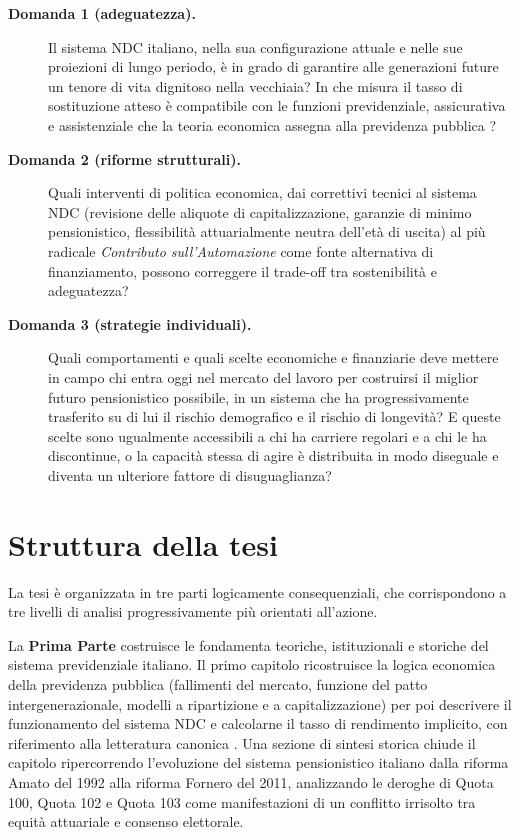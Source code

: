 \begin{description}
\item[\textbf{Domanda 1 (adeguatezza).}]
Il sistema NDC italiano, nella sua configurazione attuale e nelle sue proiezioni di
lungo periodo, è in grado di garantire alle generazioni future un tenore di vita
dignitoso nella vecchiaia? In che misura il tasso di sostituzione atteso è compatibile
con le funzioni previdenziale, assicurativa e assistenziale che la teoria economica
assegna alla previdenza pubblica \cite{Bosi2018}?

\item[\textbf{Domanda 2 (riforme strutturali).}]
Quali interventi di politica economica, dai correttivi tecnici al sistema NDC
(revisione delle aliquote di capitalizzazione, garanzie di minimo pensionistico,
flessibilità attuarialmente neutra dell'età di uscita) al più radicale
\emph{Contributo sull'Automazione} come fonte alternativa di finanziamento,
possono correggere il trade-off tra sostenibilità e adeguatezza?

\item[\textbf{Domanda 3 (strategie individuali).}]
Quali comportamenti e quali scelte economiche e finanziarie deve mettere in
campo chi entra oggi nel mercato del lavoro per costruirsi il miglior futuro
pensionistico possibile, in un sistema che ha progressivamente trasferito su di
lui il rischio demografico e il rischio di longevità? E queste scelte sono
ugualmente accessibili a chi ha carriere regolari e a chi le ha discontinue, o
la capacità stessa di agire è distribuita in modo diseguale e diventa un
ulteriore fattore di disuguaglianza?
\end{description}

\section*{Struttura della tesi}

La tesi è organizzata in tre parti logicamente consequenziali, che corrispondono a
tre livelli di analisi progressivamente più orientati all'azione.

La \textbf{Prima Parte} costruisce le fondamenta teoriche, istituzionali e storiche
del sistema previdenziale italiano. Il primo capitolo ricostruisce la logica economica
della previdenza pubblica (fallimenti del mercato, funzione del patto
intergenerazionale, modelli a ripartizione e a capitalizzazione) per poi
descrivere il funzionamento del sistema NDC e calcolarne il tasso di rendimento
implicito, con riferimento alla letteratura canonica \cite{Bosi2018, Artoni2014}.
Una sezione di sintesi storica chiude il capitolo ripercorrendo l'evoluzione del
sistema pensionistico italiano dalla riforma Amato del 1992 alla riforma Fornero
del 2011, analizzando le deroghe di Quota 100, Quota 102 e Quota 103 come
manifestazioni di un conflitto irrisolto tra equità attuariale e consenso elettorale.

